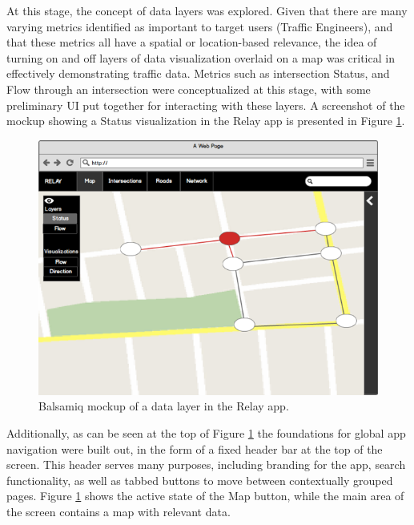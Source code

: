 \documentclass{report}
\begin{document}
At this stage, the concept of data layers was explored.
Given that there are many varying metrics identified as important to target users (Traffic Engineers), and that these metrics all have a spatial or location-based relevance, the idea of turning on and off layers of data visualization overlaid on a map was critical in effectively demonstrating traffic data.
Metrics such as intersection Status, and Flow through an intersection were conceptualized at this stage, with some preliminary UI put together for interacting with these layers.
A screenshot of the mockup showing a Status visualization in the Relay app is presented in Figure \ref{fig:bals-1}. \\

\begin{figure}[htbp!]
  \begin{centering}
    \includegraphics[scale=0.65]{figures/bals-1.png}
    \caption{Balsamiq mockup of a data layer in the Relay app.}
    \label{fig:bals-1}
  \end{centering}
\end{figure}

Additionally, as can be seen at the top of Figure \ref{fig:bals-1} the foundations for global app navigation were built out, in the form of a fixed header bar at the top of the screen.
This header serves many purposes, including branding for the app, search functionality, as well as tabbed buttons to move between contextually grouped pages.
Figure \ref{fig:bals-1} shows the active state of the Map button, while the main area of the screen contains a map with relevant data.
\end{document}
